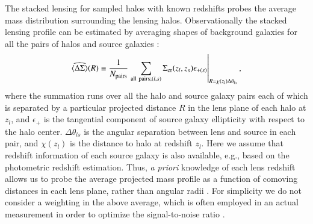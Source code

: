 \documentclass[onecolumn,notitlepage,showpacs,amsmath,amssymb,prd,floatfix]{revtex4-1}
\def\ave#1{\left\langle #1 \right\rangle}
\newcommand{\sigmacr}{\Sigma_{\rm cr}}
\newcommand{\dsigma}{\Delta\Sigma}
\begin{document}
The stacked lensing for sampled halos with known redshifts probes the
average mass distribution surrounding the lensing halos. Observationally
the stacked lensing profile can be estimated by averaging shapes of
background galaxies for all the pairs of halos and source galaxies
\cite{Miyatakeetal:15,Niikuraetal:15}:
%
\begin{equation}
 \widehat{\ave{\dsigma}}(R)\equiv\frac{1}{N_{\rm pairs}}
	\left.\sum_{{\rm all~ pairs}; (l,s)}\sigmacr(z_{l},z_s)\epsilon_{+(s)}
	\right|_{R=\chi(z_{l})\Delta\theta_{ls}},
\end{equation}
%
where the summation runs over all the halo and source galaxy pairs each
of which is separated by a particular projected distance $R$ in the lens
plane of each halo at $z_l$, and $\epsilon_+$ is the tangential
component of source galaxy ellipticity with respect to the halo
center. $\Delta\theta_{ls}$ is the angular separation between lens and
source in each pair, and $\chi(z_l)$ is the distance to halo at redshift
$z_l$.  Here we assume that redshift information of each source galaxy
is also available, e.g., based on the photometric redshift estimation.
Thus, {\em a priori} knowledge of each lens redshift allows us to probe
the average projected mass profile as a function of comoving distances
in each lens plane, rather than angular radii
\cite{Hikageetal:13,Nishizawaetal:13}.  For simplicity we do not
consider a weighting in the above average, which is often employed in an
actual measurement in order to optimize the signal-to-noise ratio
\citep[e.g.,][]{Miyatakeetal:15}.
\end{document}
